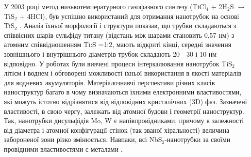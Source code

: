 У 2003 році метод низькотемпературного газофазного синтезу (TiCl$_4$ + 2H$_2$S $\rightarrow$ TiS$_2$ + 4HCl), був успішно використаний для отримання нанотрубок на основі TiS$_2$ \cite{nanotube}. Аналіз їхньої морфології і структури показав, що трубки складаються з співвісних шарів сульфіду титану (відстань між шарами становить 0,57 нм) з атомним співвідношенням Ti:S =1:2, мають відкриті кінці, середні значення зовнішнього і внутрішнього діаметрів трубок складають  20 - 30 і  10 нм відповідно. У роботах \cite{nanotube2,nanotube3} були вивчені процеси інтеркалювання нанотрубок TiS$_2$ літієм і воднем і обговорені можливості їхньої використання в якості матеріалів для водневих акумуляторів. Матеріалознавчі перспективи різних класів наноструктур багато в чому визначаються їхними електронними властивостями, які можуть істотно відрізнятися від відповідних кристалічних (3D) фаз. Зазначені властивості, в свою чергу, залежать від атомної будови і геометрії наноструктур. Так, нанотрубки дисульфідів Mo, W є напівпровідниками, причому в залежності від діаметра і атомної конфігурації стінок (так званої хіральності) величина забороненої зони різко змінюється. Навпаки, всі NbS$_2$-нанотрубки за своїми провідними властивостями є металами \cite{nanotube4,nanotube5,nanotube6}.
